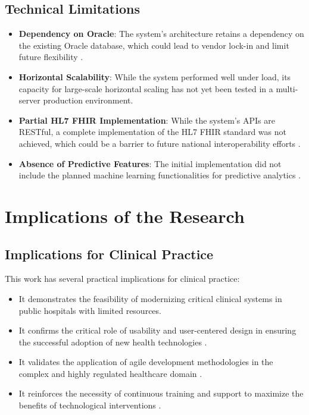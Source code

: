 \subsection{Technical Limitations}

\begin{itemize}
    \item \textbf{Dependency on Oracle}: The system's architecture retains a dependency on the existing Oracle database, which could lead to vendor lock-in and limit future flexibility \cite{lin2018}.
    \item \textbf{Horizontal Scalability}: While the system performed well under load, its capacity for large-scale horizontal scaling has not yet been tested in a multi-server production environment.
    \item \textbf{Partial HL7 FHIR Implementation}: While the system's APIs are RESTful, a complete implementation of the HL7 FHIR standard was not achieved, which could be a barrier to future national interoperability efforts \cite{mandl2020}.
    \item \textbf{Absence of Predictive Features}: The initial implementation did not include the planned machine learning functionalities for predictive analytics \cite{bates2021}.
\end{itemize}

\section{Implications of the Research}

\subsection{Implications for Clinical Practice}

This work has several practical implications for clinical practice:
\begin{itemize}
    \item It demonstrates the feasibility of modernizing critical clinical systems in public hospitals with limited resources.
    \item It confirms the critical role of usability and user-centered design in ensuring the successful adoption of new health technologies \cite{mcgreevey2020}.
    \item It validates the application of agile development methodologies in the complex and highly regulated healthcare domain \cite{vaghasiya2021}.
    \item It reinforces the necessity of continuous training and support to maximize the benefits of technological interventions \cite{kvarnstrom2023}.
\end{itemize}

